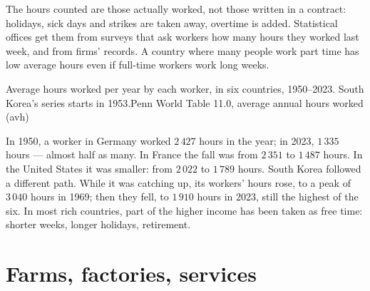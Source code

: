 \begin{measure}
The hours counted are those actually worked, not those written in a contract:
holidays, sick days and strikes are taken away, overtime is added. Statistical
offices get them from surveys that ask workers how many hours they worked last
week, and from firms' records. A country where many people work part time has
low average hours even if full-time workers work long weeks.
\end{measure}

\begin{omchart}{Average hours worked per year by each worker, in six countries,
1950--2023. South Korea's series starts in 1953.}{Penn World Table 11.0,
average annual hours worked (avh)}
\end{omchart}

In 1950, a worker in Germany worked $2\,427$ hours in the year; in 2023, $1\,335$
hours --- almost half as many. In France the fall was from $2\,351$ to $1\,487$
hours. In the United States it was smaller: from $2\,022$ to $1\,789$ hours. South
Korea followed a different path. While it was catching up, its workers' hours
rose, to a peak of $3\,040$ hours in 1969; then they fell, to $1\,910$ hours in 2023, still
the highest of the six. In most rich countries, part of the higher income has been taken
as free time: shorter weeks, longer holidays, retirement.

\section{Farms, factories, services}

